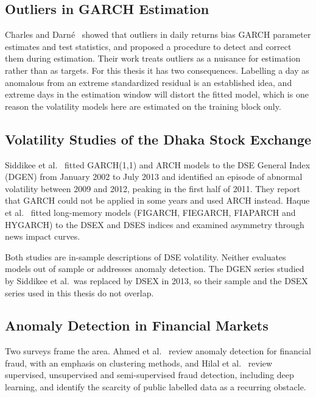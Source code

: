 \subsection{Outliers in GARCH Estimation}
Charles and Darn{\'e}~\cite{charles2005outliers} showed that outliers in daily returns
bias GARCH parameter estimates and test statistics, and proposed a procedure to detect and
correct them during estimation. Their work treats outliers as a nuisance for estimation
rather than as targets. For this thesis it has two consequences. Labelling a day as
anomalous from an extreme standardized residual is an established idea, and extreme days in
the estimation window will distort the fitted model, which is one reason the volatility
models here are estimated on the training block only.

\subsection{Volatility Studies of the Dhaka Stock Exchange}
Siddikee et al.~\cite{siddikee2016volatility} fitted GARCH(1,1) and ARCH models to the DSE
General Index (DGEN) from January 2002 to July 2013 and identified an episode of abnormal
volatility between 2009 and 2012, peaking in the first half of 2011. They report that
GARCH could not be applied in some years and used ARCH instead. Haque et
al.~\cite{haque2021modeling} fitted long-memory models (FIGARCH, FIEGARCH, FIAPARCH and
HYGARCH) to the DSEX and DSES indices and examined asymmetry through news impact curves.

Both studies are in-sample descriptions of DSE volatility. Neither evaluates models out of
sample or addresses anomaly detection. The DGEN series studied by Siddikee et al.\ was
replaced by DSEX in 2013, so their sample and the DSEX series used in this thesis do not
overlap.

\subsection{Anomaly Detection in Financial Markets}
Two surveys frame the area. Ahmed et al.~\cite{ahmed2016survey} review anomaly detection
for financial fraud, with an emphasis on clustering methods, and Hilal et
al.~\cite{hilal2022financial} review supervised, unsupervised and semi-supervised fraud
detection, including deep learning, and identify the scarcity of public labelled data as a
recurring obstacle.

